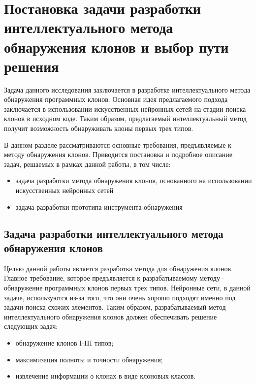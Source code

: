 \chapter{Постановка задачи разработки интеллектуального метода обнаружения клонов и выбор пути решения}

Задача данного исследования заключается в разработке интеллектуального метода обнаружения программных клонов. Основная идея предлагаемого подхода заключается в использовании искусственных нейронных сетей на стадии поиска клонов в исходном коде. Таким образом, предлагаемый интеллектуальный метод получит возможность обнаруживать клоны первых трех типов.

В данном разделе рассматриваются основные требования, предъявляемые к методу обнаружения клонов. Приводится постановка и подробное описание задач, решаемых в рамках данной работы, в том числе:
\begin{itemize}
\setlength\itemsep{0mm}
\item задача разработки метода обнаружения клонов, основанного на использовании искусственных нейронных сетей
\item задача разработки прототипа инструмента обнаружения
\end{itemize}
\section{Задача разработки интеллектуального метода обнаружения клонов}

Целью данной работы является разработка метода для обнаружения клонов. Главное требование, которое предъявляется к разрабатываемому методу - обнаружение программных клонов первых трех типов. Нейронные сети, в данной задаче, используются из-за того, что они очень хорошо подходят именно под задачи поиска схожих элементов. Таким образом, разрабатываемый метод интеллектуального обнаружения клонов должен обеспечивать решение следующих задач:
\begin{itemize}
\setlength\itemsep{0mm}
\item обнаружение клонов I-III типов;
\item максимизация полноты и точности обнаружения;
\item извлечение информации о клонах в виде клоновых классов.
\end{itemize}

